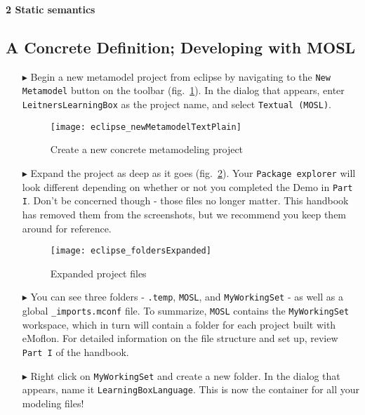 \newpage
\texHeader

{\bf \Large 2 \hspace{0.5cm}Static semantics}

\subsection[A Concrete Defintion (Textual)]{A Concrete Definition; Developing with MOSL}
\label{sec:staticConcrete}

\begin{itemize}

\item[$\blacktriangleright$] \hypertarget{static tex}{Begin a} new metamodel project from eclipse by navigating to the \texttt{New Metamodel} button on the toolbar (fig.~\ref{fig:new_project}). In the dialog that appears, enter \texttt{LeitnersLearningBox} as the project name, and select \texttt{Textual (MOSL)}.

\begin{figure}[htbp]
	\centering
  \texttt{[image: eclipse\_newMetamodelTextPlain]}
	\caption{Create a new concrete metamodeling project}
	\label{fig:new_project}
\end{figure}

\item[$\blacktriangleright$] Expand the project as deep as it goes (fig.~\ref{fig:expanded_folders}). Your \texttt{Package explorer} will look different depending on whether or not you completed the Demo in \texttt{Part I}. Don't be concerned though - those files no longer matter. This handbook has removed them from the screenshots, but we recommend you keep them around for reference.

\begin{figure}[htbp]
	\centering
  \texttt{[image: eclipse\_foldersExpanded]}
	\caption{Expanded project files}
	\label{fig:expanded_folders}
\end{figure} 

\item[$\blacktriangleright$] You can see three folders - \texttt{.temp}, \texttt{MOSL}, and \texttt{MyWorkingSet} - as well as a global \texttt{\_imports.mconf} file. To summarize, \texttt{MOSL} contains the \texttt{MyWorkingSet} workspace, which in turn will contain a folder for each project built with eMoflon. For detailed information on the file structure and set up, review \texttt{Part I} of the handbook.

\item[$\blacktriangleright$] Right click on \texttt{MyWorkingSet} and create a new folder. In the dialog that appears, name it \texttt{LearningBoxLanguage}. This is now the container for all your modeling files!


\end{itemize}
